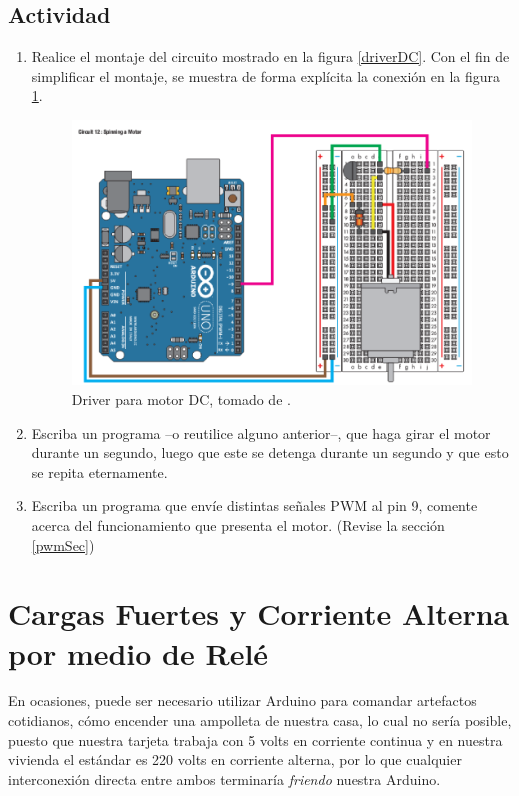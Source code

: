 \documentclass[letterpaper, 10pt]{report}
\begin{document}
\subsection{Actividad}

\begin{enumerate}
\item Realice el montaje del circuito mostrado en la figura \ref{driverDC}. Con el fin de simplificar el montaje, se muestra de forma explícita la conexión en la figura \ref{driverDCdum}.

\begin{figure}[h]
\centering
\includegraphics[scale=0.5]{driverDCdum.png}
\caption{Driver para motor DC, tomado de \cite{SIK}. \label{driverDCdum}}
\end{figure}

\item Escriba un programa --o reutilice alguno anterior--, que haga girar el motor durante un segundo, luego que este se detenga durante un segundo y que esto se repita eternamente.

\item Escriba un programa que envíe distintas señales PWM al pin 9, comente acerca del funcionamiento que presenta el motor. (Revise la sección \ref{pwmSec})
\end{enumerate}

\section{Cargas Fuertes y Corriente Alterna por medio de Relé}

En ocasiones, puede ser necesario utilizar Arduino para comandar artefactos cotidianos, cómo encender una ampolleta de nuestra casa, lo cual no sería posible, puesto que nuestra tarjeta trabaja con 5 volts en corriente continua y en nuestra vivienda el estándar es 220 volts en corriente alterna, por lo que cualquier interconexión directa entre ambos terminaría \emph{friendo} nuestra Arduino.
\end{document}
